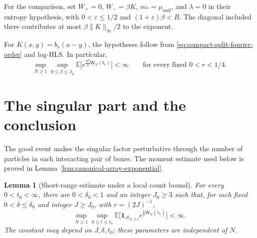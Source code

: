 \documentclass[11pt,reqno]{amsart}
\numberwithin{equation}{section}
\theoremstyle{plain}
\newtheorem{lemma}[lemma]{Lemma}
\theoremstyle{definition}
\newcommand{\E}{\mathbb E}
\newcommand{\one}{\mathbf 1}
\newcommand{\be}{\beta}
\newcommand{\muunif}{\mu_{\mathrm{unif}}}
\begin{document}
For the comparison, set $W_+=0$, $W_-=\be K$, $m_*=\muunif$, and $\lambda=0$ in their entropy hypothesis, with $0<\varepsilon\le1/2$ and $(1+\varepsilon)\be<B$.  The diagonal included there contributes at most $\be\|K\|_\infty/2$ to the exponent.

For $K(x,y)=b_r(x-y)$, the hypotheses follow from \eqref{eq:compact-split-fourier-order} and log-HLS.  In particular,
\begin{equation}
 \sup_{N\ge1}\sup_{0\le\be\le\be_0}
 \E\big[e^{\frac{p\be}{2}\mathsf W_N(b_r)}\big]<\infty
 \qquad\text{for every fixed }0<r<1/4.
 \label{eq:physical-continuous-bulk-bound}
\end{equation}

\section{The singular part and the conclusion}
\label{sec:local-singular}
The good event makes the singular factor perturbative through the number of particles in each interacting pair of boxes.  The moment estimate used below is proved in Lemma~\ref{lem:canonical-array-exponential}.
\begin{lemma}[Short-range estimate under a local count bound]
\label{lem:physical-local-count-bound}
For every $0<t_0<\infty$, there are $0<\delta_0<1$ and an integer $J_0\ge3$ such that, for each fixed $0<\delta\le\delta_0$ and integer $J\ge J_0$, with $r=(2J)^{-1}$,
\begin{equation}
 \sup_{N\ge1}\sup_{0\le t\le t_0}
 \E\Big[\one_{\mathcal A_{N,J,\delta}}
 e^{\frac t2\mathsf W_N(\widetilde s_r)}\Big]<\infty.
 \label{eq:physical-local-count-conclusion}
\end{equation}
The constant may depend on $J,\delta,t_0$; these parameters are independent of $N$.
\end{lemma}
\end{document}
